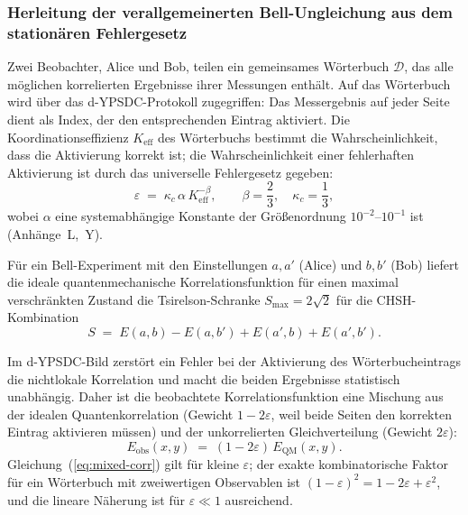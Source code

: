 \documentclass[12pt,a4paper]{article}
\theoremstyle{remark}
\begin{document}
	\subsubsection{Herleitung der verallgemeinerten Bell-Ungleichung aus dem stationären Fehlergesetz}
	\label{subsec:bell-derivation}
	
	Zwei Beobachter, Alice und Bob, teilen ein gemeinsames Wörterbuch $\mathcal{D}$, das alle möglichen korrelierten Ergebnisse ihrer Messungen enthält. Auf das Wörterbuch wird über das d-YPSDC-Protokoll zugegriffen: Das Messergebnis auf jeder Seite dient als Index, der den entsprechenden Eintrag aktiviert. Die Koordinationseffizienz $K_{\mathrm{eff}}$ des Wörterbuchs bestimmt die Wahrscheinlichkeit, dass die Aktivierung korrekt ist; die Wahrscheinlichkeit einer fehlerhaften Aktivierung ist durch das universelle Fehlergesetz gegeben:
	\begin{equation}
		\varepsilon \;=\; \kappa_c\,\alpha\,K_{\mathrm{eff}}^{-\beta},
		\qquad \beta = \frac{2}{3},\quad \kappa_c = \frac{1}{3},
		\label{eq:error-law-bell}
	\end{equation}
	wobei $\alpha$ eine systemabhängige Konstante der Größenordnung $10^{-2}$–$10^{-1}$ ist (Anhänge~L,~Y).
	
	Für ein Bell-Experiment mit den Einstellungen $a,a'$ (Alice) und $b,b'$ (Bob) liefert die ideale quantenmechanische Korrelationsfunktion für einen maximal verschränkten Zustand die Tsirelson-Schranke $S_{\max}=2\sqrt{2}$ für die CHSH-Kombination
	\[
	S \;=\; E(a,b)-E(a,b')+E(a',b)+E(a',b').
	\]
	
	Im d-YPSDC-Bild zerstört ein Fehler bei der Aktivierung des Wörterbucheintrags die nichtlokale Korrelation und macht die beiden Ergebnisse statistisch unabhängig. Daher ist die beobachtete Korrelationsfunktion eine Mischung aus der idealen Quantenkorrelation (Gewicht $1-2\varepsilon$, weil beide Seiten den korrekten Eintrag aktivieren müssen) und der unkorrelierten Gleichverteilung (Gewicht $2\varepsilon$):
	\begin{equation}
		E_{\mathrm{obs}}(x,y) \;=\; (1-2\varepsilon)\,E_{\mathrm{QM}}(x,y).
		\label{eq:mixed-corr}
	\end{equation}
	Gleichung~(\ref{eq:mixed-corr}) gilt für kleine $\varepsilon$; der exakte kombinatorische Faktor für ein Wörterbuch mit zweiwertigen Observablen ist $(1-\varepsilon)^2 = 1-2\varepsilon + \varepsilon^2$, und die lineare Näherung ist für $\varepsilon\ll1$ ausreichend.
	
\end{document}

